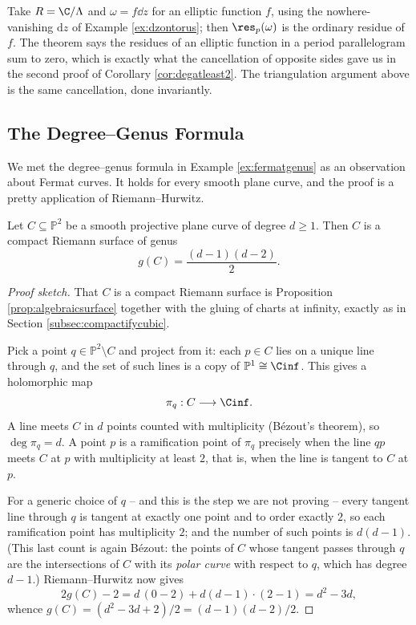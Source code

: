 \begin{example}
	Take $R = \C/\Lambda$ and $\omega = f\dd z$ for an elliptic function $f$, using the
	nowhere-vanishing $\mathrm{d}z$ of Example \ref{ex:dzontorus}; then $\res_p(\omega)$ is the
	ordinary residue of $f$. The theorem says the residues of an elliptic function in a
	period parallelogram sum to zero, which is exactly what the cancellation of opposite
	sides gave us in the second proof of Corollary \ref{cor:degatleast2}. The
	triangulation argument above is the same cancellation, done invariantly.
\end{example}

\subsection{The Degree--Genus Formula}

We met the degree--genus formula in Example \ref{ex:fermatgenus} as an observation about
Fermat curves. It holds for every smooth plane curve, and the proof is a pretty
application of Riemann--Hurwitz.

\begin{theorem}\label{thm:degreegenus}
	Let $C \subseteq \mathbb{P}^2$ be a smooth projective plane curve of degree $d \geq 1$.
	Then $C$ is a compact Riemann surface of genus
	$$
	g(C) = \frac{(d-1)(d-2)}{2}.
	$$
\end{theorem}

\begin{proof}[Proof sketch]
	That $C$ is a compact Riemann surface is Proposition \ref{prop:algebraicsurface}
	together with the gluing of charts at infinity, exactly as in Section
	\ref{subsec:compactifycubic}.

	Pick a point $q \in \mathbb{P}^2 \setminus C$ and project from it: each $p \in C$ lies
	on a unique line through $q$, and the set of such lines is a copy of
	$\mathbb{P}^1 \cong \Cinf$. This gives a holomorphic map
	$$
	\pi_q : C \longrightarrow \Cinf.
	$$
	A line meets $C$ in $d$ points counted with multiplicity (B\'ezout's theorem), so
	$\deg \pi_q = d$. A point $p$ is a ramification point of $\pi_q$ precisely when the
	line $qp$ meets $C$ at $p$ with multiplicity at least $2$, that is, when the line is
	tangent to $C$ at $p$.

	For a generic choice of $q$ -- and this is the step we are not proving -- every tangent
	line through $q$ is tangent at exactly one point and to order exactly $2$, so each
	ramification point has multiplicity $2$; and the number of such points is $d(d-1)$.
	(This last count is again B\'ezout: the points of $C$ whose tangent passes through $q$
	are the intersections of $C$ with its \emph{polar curve} with respect to $q$, which has
	degree $d - 1$.) Riemann--Hurwitz now gives
	$$
	2g(C) - 2 = d\,(0 - 2) + d(d-1)\cdot(2-1) = d^2 - 3d,
	$$
	whence $g(C) = (d^2-3d+2)/2 = (d-1)(d-2)/2$.
\end{proof}


